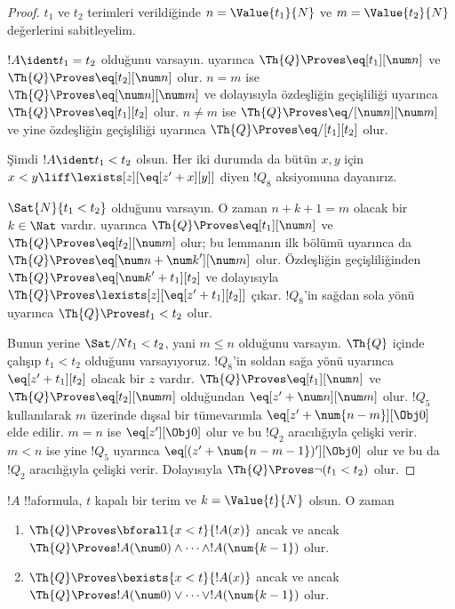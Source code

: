 \begin{proof}
$t_1$ ve $t_2$ terimleri verildiğinde $n=\Value{t_1}{N}$ ve
$m=\Value{t_2}{N}$ değerlerini sabitleyelim.

$!A\ident t_1=t_2$ olduğunu varsayın. 
uyarınca $\Th{Q} \Proves \eq[t_1][\num n]$ ve
$\Th{Q} \Proves \eq[t_2][\num n]$ olur. $n=m$ ise
$\Th{Q} \Proves \eq[\num n][\num m]$ ve dolayısıyla özdeşliğin geçişliliği
uyarınca $\Th{Q} \Proves \eq[t_1][t_2]$ olur. $n\neq m$ ise
$\Th{Q} \Proves \eq/[\num n][\num m]$ ve yine özdeşliğin geçişliliği
uyarınca $\Th{Q} \Proves \eq/[t_1][t_2]$ olur.

Şimdi $!A\ident t_1<t_2$ olsun. Her iki durumda da bütün $x,y$ için
$x<y\liff\lexists[z][\eq[z'+x][y]]$ diyen $!Q_8$ aksiyomuna dayanırız.

$\Sat{N}{t_1<t_2}$ olduğunu varsayın. O zaman $n+k+1=m$ olacak bir
$k\in\Nat$ vardır.  uyarınca
$\Th{Q} \Proves \eq[t_1][\num n]$ ve
$\Th{Q} \Proves \eq[t_2][\num m]$ olur; bu lemmanın ilk bölümü uyarınca da
$\Th{Q} \Proves \eq[\num n+{\num k}'][\num m]$ olur. Özdeşliğin
geçişliliğinden $\Th{Q} \Proves \eq[{\num k}'+t_1][t_2]$ ve dolayısıyla
$\Th{Q} \Proves \lexists[z][\eq[z'+t_1][t_2]]$ çıkar. $!Q_8$'in sağdan
sola yönü uyarınca $\Th{Q} \Proves t_1<t_2$ olur.

Bunun yerine $\Sat/{N}{t_1<t_2}$, yani $m\leq n$ olduğunu varsayın.
%
$\Th{Q}$ içinde çalışıp $t_1<t_2$ olduğunu varsayıyoruz. $!Q_8$'in soldan
sağa yönü uyarınca $\eq[z'+t_1][t_2]$ olacak bir $z$ vardır.
$\Th{Q} \Proves \eq[t_1][\num n]$ ve
$\Th{Q} \Proves \eq[t_2][\num m]$ olduğundan
$\eq[z'+\num n][\num m]$ olur.
%
$!Q_5$ kullanılarak $m$ üzerinde dışsal bir tümevarımla
$\eq[z'+\num{n-m}][\Obj 0]$ elde edilir.
$m=n$ ise $\eq[z'][\Obj 0]$ olur ve bu $!Q_2$ aracılığıyla çelişki verir.
$m<n$ ise yine $!Q_5$ uyarınca
$\eq[(z'+\num{n-m-1})'][\Obj 0]$ olur ve bu da $!Q_2$ aracılığıyla çelişki
verir. Dolayısıyla $\Th{Q} \Proves \lnot(t_1<t_2)$ olur.
\end{proof}

\begin{lem}
$!A$ !!a{formula}, $t$ kapalı bir terim ve $k=\Value{t}{N}$ olsun. O zaman
\begin{enumerate}
\item $\Th{Q} \Proves \bforall{x<t}{!A(x)}$ ancak ve ancak $\Th{Q} \Proves
    !A(\num 0) \land \dots \land !A(\num{k-1})$ olur.
\item $\Th{Q} \Proves \bexists{x<t}{!A(x)}$ ancak ve ancak $\Th{Q} \Proves
    !A(\num 0) \lor \dots \lor !A(\num{k-1})$ olur.
\end{enumerate}
\end{lem}

